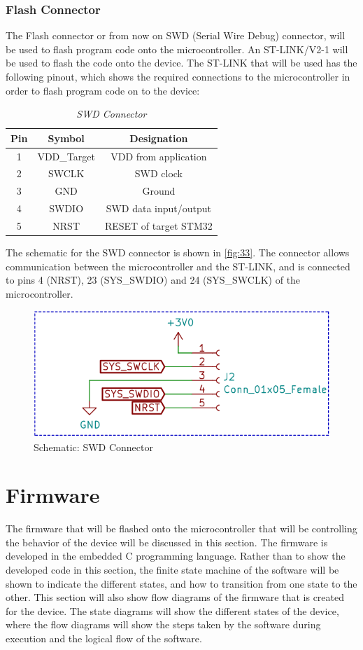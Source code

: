 \subsubsection{Flash Connector}
The Flash connector or from now on SWD (Serial Wire Debug) connector, will be used to flash program code onto the microcontroller. An ST-LINK/V2-1 will be used to flash the code onto the device. The ST-LINK that will be used has the following pinout, which shows the required connections to the microcontroller in order to flash program code on to the device:
\begin{table}[H]
	\centering
	\caption{\textit{SWD Connector}}
	\label{tab:5}
	\begin{tabular}{|c|c|c|}
		\hline
		\textbf{Pin} & \textbf{Symbol} & \textbf{Designation}\\
		\hline
		\hline
		1 & VDD\_Target & VDD from application\\
		\hline
		2 & SWCLK & SWD clock\\
		\hline
		3 & GND & Ground\\
		\hline
		4 & SWDIO & SWD data input/output\\
		\hline
		5 & NRST & RESET of target STM32\\
		\hline
	\end{tabular}
\end{table}
\noindent
The schematic for the SWD connector is shown in \autoref{fig:33}. The connector allows communication between the microcontroller and the ST-LINK, and is connected to pins 4 (NRST), 23 (SYS\_SWDIO) and 24 (SYS\_SWCLK) of the microcontroller.
\begin{figure}[H]
	\centering
	\includegraphics[scale=0.6]{img/Schematic_SWD}
	\caption{Schematic: SWD Connector}
	\label{fig:33}
\end{figure}

\section{Firmware}
The firmware that will be flashed onto the microcontroller that will be controlling the behavior of the device will be discussed in this section. The firmware is developed in the embedded C programming language. Rather than to show the developed code in this section, the finite state machine of the software will be shown to indicate the different states, and how to transition from one state to the other. This section will also show flow diagrams of the firmware that is created for the device. The state diagrams will show the different states of the device, where the flow diagrams will show the steps taken by the software during execution and the logical flow of the software.

